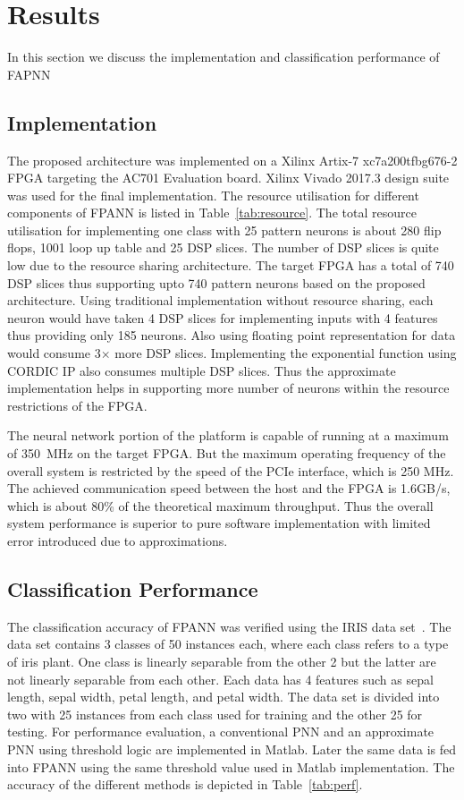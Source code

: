 \section{Results}
\label{sec_results}

In this section we discuss the implementation and classification performance of FAPNN

\subsection{Implementation}

The proposed architecture was implemented on a Xilinx Artix-7 xc7a200tfbg676-2 FPGA targeting the AC701 Evaluation board.
Xilinx Vivado 2017.3 design suite was used for the final implementation.
The resource utilisation for different components of FPANN is listed in Table~\ref{tab:resource}. 
The total resource utilisation for implementing one class with 25 pattern neurons is about 280 flip flops, 1001 loop up table and 25 DSP slices.
The number of DSP slices is quite low due to the resource sharing architecture.
The target FPGA has a total of 740 DSP slices thus supporting upto 740 pattern neurons based on the proposed architecture.
Using traditional implementation without resource sharing, each neuron would have taken 4 DSP slices for implementing inputs with 4 features thus providing only 185 neurons.
Also using floating point representation for data would consume 3$\times$ more DSP slices.
Implementing the exponential function using CORDIC IP also consumes multiple DSP slices.
Thus the approximate implementation helps in supporting more number of neurons within the resource restrictions of the FPGA.

The neural network portion of the platform is capable of running at a maximum of 350~MHz on the target FPGA.
But the maximum operating frequency of the overall system is restricted by the speed of the PCIe interface, which is 250 MHz.
The achieved communication speed between the host and the FPGA is 1.6GB/s, which is about 80\% of the theoretical maximum throughput.
Thus the overall system performance is superior to pure software implementation with limited error introduced due to approximations.
\subsection{Classification Performance}



The classification accuracy of FPANN was verified using the IRIS data set~\cite{iris}.
The data set contains 3 classes of 50 instances each, where each class refers to a type of iris plant. 
One class is linearly separable from the other 2 but the latter are not linearly separable from each other.
Each data has 4 features such as sepal length, sepal width, petal length, and petal width. 
The data set is divided into two with 25 instances from each class used for training and the other 25 for testing.
For performance evaluation, a conventional PNN and an approximate PNN using threshold logic are implemented in Matlab.
Later the same data is fed into FPANN using the same threshold value used in Matlab implementation.
The accuracy of the different methods is depicted in Table~\ref{tab:perf}.

